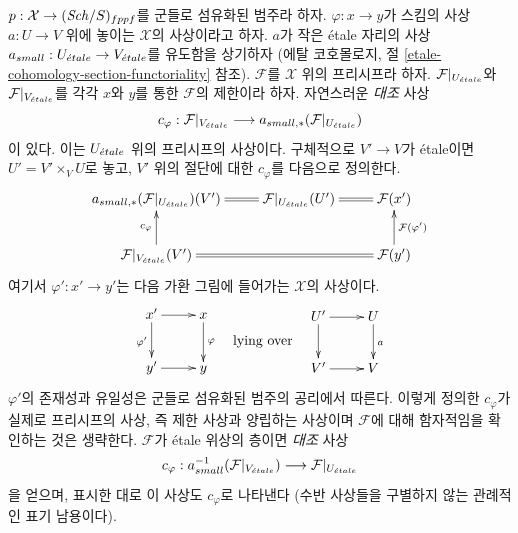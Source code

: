 \medskip\noindent
$p : \mathcal{X} \to (\mathit{Sch}/S)_{fppf}$를 군들로 섬유화된 범주라 하자.
$\varphi : x \to y$가 스킴의 사상 $a : U \to V$ 위에 놓이는
$\mathcal{X}$의 사상이라고 하자. $a$가 작은 \'etale 자리의 사상
$a_{small} : U_{\acute{e}tale} \to V_{\acute{e}tale}$를 유도함을 상기하자
(에탈 코호몰로지, 절
\ref{etale-cohomology-section-functoriality} 참조).
$\mathcal{F}$를 $\mathcal{X}$ 위의 프리시프라 하자.
$\mathcal{F}|_{U_{\acute{e}tale}}$와 $\mathcal{F}|_{V_{\acute{e}tale}}$를 각각
$x$와 $y$를 통한 $\mathcal{F}$의 제한이라 하자. 자연스러운
{\it 대조} 사상
\begin{equation}
\label{equation-comparison-push}
c_\varphi :
\mathcal{F}|_{V_{\acute{e}tale}}
\longrightarrow
a_{small, *}(\mathcal{F}|_{U_{\acute{e}tale}})
\end{equation}
이 있다. 이는 $U_{\acute{e}tale}$ 위의 프리시프의 사상이다. 구체적으로
$V' \to V$가 \'etale이면 $U' = V' \times_V U$로 놓고,
$V'$ 위의 절단에 대한 $c_\varphi$를 다음으로 정의한다.
$$
\xymatrix{
a_{small, *}(\mathcal{F}|_{U_\etale})(V') &
\mathcal{F}|_{U_\etale}(U') \ar@{=}[l] &
\mathcal{F}(x') \ar@{=}[l] \\
\mathcal{F}|_{V_\etale}(V') \ar@{=}[rr] \ar[u]^{c_\varphi} &
&
\mathcal{F}(y') \ar[u]_{\mathcal{F}(\varphi')}
}
$$
여기서 $\varphi' : x' \to y'$는 다음 가환 그림에 들어가는
$\mathcal{X}$의 사상이다.
$$
\vcenter{
\xymatrix{
x' \ar[r] \ar[d]_{\varphi'} & x \ar[d]^\varphi \\
y' \ar[r] & y
}
}
\quad\text{lying over}\quad
\vcenter{
\xymatrix{
U' \ar[r] \ar[d] & U \ar[d]^a \\
V' \ar[r] & V
}
}
$$
$\varphi'$의 존재성과 유일성은 군들로 섬유화된 범주의 공리에서
따른다. 이렇게 정의한 $c_\varphi$가 실제로 프리시프의 사상, 즉
제한 사상과 양립하는 사상이며 $\mathcal{F}$에 대해 함자적임을
확인하는 것은 생략한다. $\mathcal{F}$가 \'etale 위상의 층이면
{\it 대조} 사상
\begin{equation}
\label{equation-comparison}
c_\varphi : a_{small}^{-1}(\mathcal{F}|_{V_{\acute{e}tale}})
\longrightarrow
\mathcal{F}|_{U_{\acute{e}tale}}
\end{equation}
을 얻으며, 표시한 대로 이 사상도 $c_\varphi$로 나타낸다
(수반 사상들을 구별하지 않는 관례적인 표기 남용이다).

